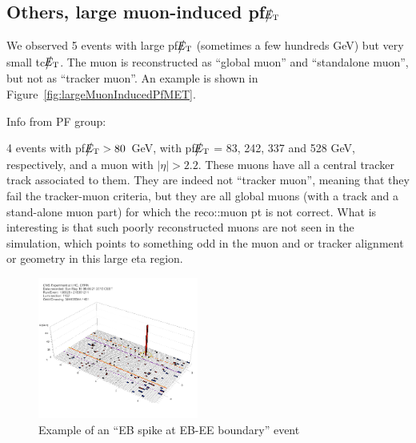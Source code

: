 \subsection{Others, large muon-induced pf$\big\slash\hspace{-1.6ex}{E_\text{T}}$}
We observed 5 events with large pf$\big\slash\hspace{-1.6ex}{E_\text{T}}$ (sometimes a few hundreds GeV) 
but very small tc$\big\slash\hspace{-1.6ex}{E_\text{T}}$. 
The muon is reconstructed as ``global muon'' and ``standalone muon'', 
but not as ``tracker muon''. An example is shown in Figure~\ref{fig:largeMuonInducedPfMET}.

Info from PF group:

4 events with pf$\big\slash\hspace{-1.6ex}{E_\text{T}}>80$~GeV, with pf$\big\slash\hspace{-1.6ex}{E_\text{T}}$ = 83, 242, 337
and 528 GeV, respectively, and a muon with $|\eta| > 2.2$. 
These muons have all a central tracker track associated to them. They are
indeed not ``tracker muon'', meaning that they fail the tracker-muon
criteria, but they are all global muons (with a track and a stand-alone
muon part) for which the reco::muon pt is not correct. 
What is interesting is that such poorly reconstructed muons are not seen
in the simulation, which points to something odd in the muon and or
tracker alignment or geometry in this large eta region.

%
\begin{figure}[h]
 \centering
   \includegraphics[width=0.47\textwidth]{fig/EBspikeAtBorder.png} 
\caption{Example of an ``EB spike at EB-EE boundary'' event}
\label{fig:EBspikeAtBorder}
\end{figure}


